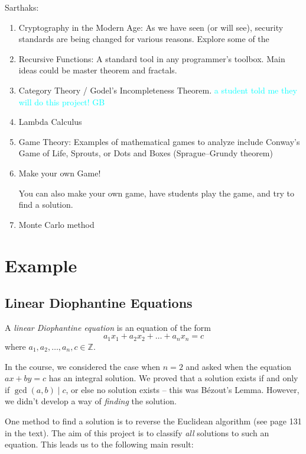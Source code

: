 \documentclass{article}
\begin{document}
Sarthaks:
\begin{enumerate}[label = \arabic*.]
    \item Cryptography in the Modern Age: As we have seen (or will see), security standards are being changed for various reasons. Explore some of the 
    \item Recursive Functions: A standard tool in any programmer's toolbox. Main ideas could be master theorem and fractals.
    \item Category Theory / Godel's Incompleteness Theorem. \textcolor{cyan}{a student told me they will do this project! GB}
    \item Lambda Calculus
    \item Game Theory: Examples of mathematical games to analyze include Conway's Game of Life, Sprouts, or Dots and Boxes (Sprague–Grundy theorem)
    \item Make your own Game!
    
    You can also make your own game, have students play the game, and try to find a solution.
    \item Monte Carlo method
\end{enumerate}

\pagebreak

\section*{Example}

\subsection*{Linear Diophantine Equations}
    A \textit{linear Diophantine equation} is an equation of the form $$a_{1}x_{1} + a_{2}x_{2} + \dots + a_{n}x_{n} = c$$ where $a_{1}, a_{2}, \dots, a_{n}, c \in \mathbb{Z}$.
    
    \vspace{3mm}
    In the course, we considered the case when $n = 2$ and asked when the equation $ax + by = c$ has an integral solution. We proved that a solution exists if and only if $\gcd(a, b) \mid c$, or else no solution exists -- this was B\'ezout's Lemma. However, we didn't develop a way of \textit{finding} the solution.
    
    \vspace{3mm}
    One method to find a solution is to reverse the Euclidean algorithm (see page 131 in the text). The aim of this project is to classify \textit{all} solutions to such an equation. This leads us to the following main result:
    
\end{document}
